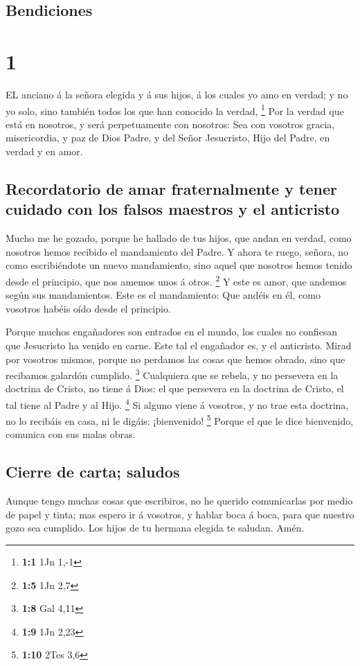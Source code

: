 \hypertarget{bendiciones}{%
\subsection{Bendiciones}\label{bendiciones}}

\hypertarget{section}{%
\section{1}\label{section}}

 EL anciano á la señora elegida y á sus hijos, á los cuales
yo amo en verdad; y no yo solo, sino también todos los que han conocido
la verdad, \footnote{\textbf{1:1} 1Jn 1,-1}  Por la verdad
que está en nosotros, y será perpetuamente con nosotros: 
Sea con vosotros gracia, misericordia, y paz de Dios Padre, y del Señor
Jesucristo, Hijo del Padre, en verdad y en amor.

\hypertarget{recordatorio-de-amar-fraternalmente-y-tener-cuidado-con-los-falsos-maestros-y-el-anticristo}{%
\subsection{Recordatorio de amar fraternalmente y tener cuidado con los
falsos maestros y el
anticristo}\label{recordatorio-de-amar-fraternalmente-y-tener-cuidado-con-los-falsos-maestros-y-el-anticristo}}

 Mucho me he gozado, porque he hallado de tus hijos, que
andan en verdad, como nosotros hemos recibido el mandamiento del Padre.
 Y ahora te ruego, señora, no como escribiéndote un nuevo
mandamiento, sino aquel que nosotros hemos tenido desde el principio,
que nos amemos unos á otros. \footnote{\textbf{1:5} 1Jn 2,7}
 Y este es amor, que andemos según sus mandamientos. Este es
el mandamiento: Que andéis en él, como vosotros habéis oído desde el
principio.

 Porque muchos engañadores son entrados en el mundo, los
cuales no confiesan que Jesucristo ha venido en carne. Este tal el
engañador es, y el anticristo.  Mirad por vosotros mismos,
porque no perdamos las cosas que hemos obrado, sino que recibamos
galardón cumplido. \footnote{\textbf{1:8} Gal 4,11} 
Cualquiera que se rebela, y no persevera en la doctrina de Cristo, no
tiene á Dios: el que persevera en la doctrina de Cristo, el tal tiene al
Padre y al Hijo. \footnote{\textbf{1:9} 1Jn 2,23}  Si
alguno viene á vosotros, y no trae esta doctrina, no lo recibáis en
casa, ni le digáis: ¡bienvenido! \footnote{\textbf{1:10} 2Tes 3,6}
 Porque el que le dice bienvenido, comunica con sus malas
obras.

\hypertarget{cierre-de-carta-saludos}{%
\subsection{Cierre de carta; saludos}\label{cierre-de-carta-saludos}}

 Aunque tengo muchas cosas que escribiros, no he querido
comunicarlas por medio de papel y tinta; mas espero ir á vosotros, y
hablar boca á boca, para que nuestro gozo sea cumplido. 
Los hijos de tu hermana elegida te saludan. Amén.
